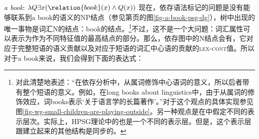 \ex \emph{a book}: $\lambda Q \exists x (\relation{book}(x) \wedge Q(x))$
\zl
现在，依存语法标记的问题是没有能够联系到a book的语义的NP结点（参见第\pageref{fig-a-book-psg-dg}页的图\ref{fig-a-book-psg-dg}），树中出现的唯一事物是词汇N的结点：book的结点。\footnote{\citet[--392]{Hudson2003a}\indexwg 对此清楚地表述：“在依存分析中，从属词修饰中心语词的意义，所以后者带有整个短语的意义。例如，在long books about linguistics中，由于从属词的修饰效应，词books表示‘关于语言学的长篇著作’。”对于这个观点的具体实现参见图\vref{fig-wg-small-children-are-playing-outside}。另一种观点是在\mttc 中假定不同的表示层次\citep{Melcuk81a}。实际上，HPSG理论中的\contvc 也是一个不同的表示层。但是，这个表示层跟建立起来的其他结构是同步的。}不过，这不是一个大问题：词汇属性可以表示为作为不同特征值的最高结点的部分。那么，依存图中的N结点会有\contvc，它对应于完整短语的语义贡献以及对应于短语的词汇中心语的贡献的\textsc{lex-cont}值。所以对于a book来说，我们会得到下面的表达式：
\ea
{}
\z
